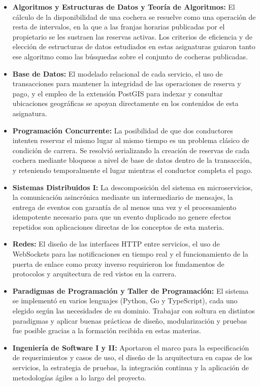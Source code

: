 \begin{itemize}
    \item \textbf{Algoritmos y Estructuras de Datos y Teoría de Algoritmos:} El cálculo de la disponibilidad de una cochera se resuelve como una operación de resta de intervalos, en la que a las franjas horarias publicadas por el propietario se les sustraen las reservas activas. Los criterios de eficiencia y de elección de estructuras de datos estudiados en estas asignaturas guiaron tanto ese algoritmo como las búsquedas sobre el conjunto de cocheras publicadas.
    \item \textbf{Base de Datos:} El modelado relacional de cada servicio, el uso de transacciones para mantener la integridad de las operaciones de reserva y pago, y el empleo de la extensión PostGIS para indexar y consultar ubicaciones geográficas se apoyan directamente en los contenidos de esta asignatura.
    \item \textbf{Programación Concurrente:} La posibilidad de que dos conductores intenten reservar el mismo lugar al mismo tiempo es un problema clásico de condición de carrera. Se resolvió serializando la creación de reservas de cada cochera mediante bloqueos a nivel de base de datos dentro de la transacción, y reteniendo temporalmente el lugar mientras el conductor completa el pago.
    \item \textbf{Sistemas Distribuidos I:} La descomposición del sistema en microservicios, la comunicación asincrónica mediante un intermediario de mensajes, la entrega de eventos con garantía de al menos una vez y el procesamiento idempotente necesario para que un evento duplicado no genere efectos repetidos son aplicaciones directas de los conceptos de esta materia.
    \item \textbf{Redes:} El diseño de las interfaces HTTP entre servicios, el uso de WebSockets para las notificaciones en tiempo real y el funcionamiento de la puerta de enlace como proxy inverso requirieron los fundamentos de protocolos y arquitectura de red vistos en la carrera.
    \item \textbf{Paradigmas de Programación y Taller de Programación:} El sistema se implementó en varios lenguajes (Python, Go y TypeScript), cada uno elegido según las necesidades de su dominio. Trabajar con soltura en distintos paradigmas y aplicar buenas prácticas de diseño, modularización y pruebas fue posible gracias a la formación recibida en estas materias.
    \item \textbf{Ingeniería de Software I y II:} Aportaron el marco para la especificación de requerimientos y casos de uso, el diseño de la arquitectura en capas de los servicios, la estrategia de pruebas, la integración continua y la aplicación de metodologías ágiles a lo largo del proyecto.

\end{itemize}
